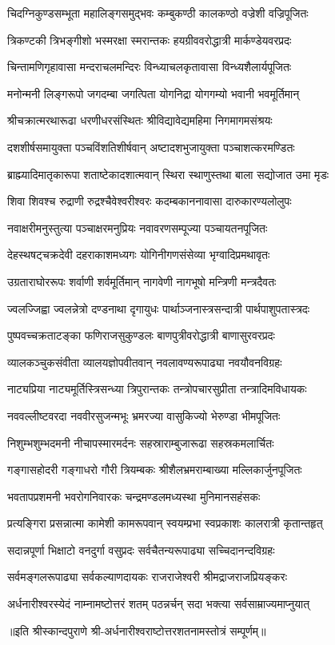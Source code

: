 \twolineshloka
{चिदग्निकुण्डसम्भूता महालिङ्गसमुद्भवः}
{कम्बुकण्ठी कालकण्ठो वज्रेशी वज्रिपूजितः}%

\twolineshloka
{त्रिकण्टकी त्रिभङ्गीशो भस्मरक्षा स्मरान्तकः}
{हयग्रीववरोद्धात्री मार्कण्डेयवरप्रदः}%

\twolineshloka
{चिन्तामणिगृहावासा मन्दराचलमन्दिरः}
{विन्ध्याचलकृतावासा विन्ध्यशैलार्यपूजितः}%

\twolineshloka
{मनोन्मनी लिङ्गरूपो जगदम्बा जगत्पिता}
{योगनिद्रा योगगम्यो भवानी भवमूर्तिमान्}%

\twolineshloka
{श्रीचक्रात्मरथारूढा धरणीधरसंस्थितः}
{श्रीविद्यावेद्यमहिमा निगमागमसंश्रयः}%

\twolineshloka
{दशशीर्षसमायुक्ता पञ्चविंशतिशीर्षवान्}
{अष्टादशभुजायुक्ता पञ्चाशत्करमण्डितः}%

\twolineshloka
{ब्राह्म्यादिमातृकारूपा शताष्टेकादशात्मवान्}
{स्थिरा स्थाणुस्तथा बाला सद्योजात उमा मृडः}%

\twolineshloka
{शिवा शिवश्च रुद्राणी रुद्रश्चैवेश्वरीश्वरः}
{कदम्बकाननावासा दारुकारण्यलोलुपः}%

\twolineshloka
{नवाक्षरीमनुस्तुत्या पञ्चाक्षरमनुप्रियः}
{नवावरणसम्पूज्या पञ्चायतनपूजितः}%

\twolineshloka
{देहस्थषट्चक्रदेवी दहराकाशमध्यगः}
{योगिनीगणसंसेव्या भृग्वादिप्रमथावृतः}%

\twolineshloka
{उग्रताराघोररूपः शर्वाणी शर्वमूर्तिमान्}
{नागवेणी नागभूषो मन्त्रिणी मन्त्रदैवतः}%

\twolineshloka
{ज्वलज्जिह्वा ज्वलन्नेत्रो दण्डनाथा दृगायुधः}
{पार्थाञ्जनास्त्रसन्दात्री पार्थपाशुपतास्त्रदः}%

\twolineshloka
{पुष्पवच्चक्रताटङ्का फणिराजसुकुण्डलः}
{बाणपुत्रीवरोद्धात्री बाणासुरवरप्रदः}%

\twolineshloka
{व्यालकञ्चुकसंवीता व्यालयज्ञोपवीतवान्}
{नवलावण्यरूपाढ्या नवयौवनविग्रहः}%

\twolineshloka
{नाट्यप्रिया नाट्यमूर्तिस्त्रिसन्ध्या त्रिपुरान्तकः}
{तन्त्रोपचारसुप्रीता तन्त्रादिमविधायकः}%

\twolineshloka
{नववल्लीष्टवरदा नववीरसुजन्मभूः}
{भ्रमरज्या वासुकिज्यो भेरुण्डा भीमपूजितः}%

\twolineshloka
{निशुम्भशुम्भदमनी नीचापस्मारमर्दनः}
{सहस्राराम्बुजारूढा सहस्रकमलार्चितः}%

\twolineshloka
{गङ्गासहोदरी गङ्गाधरो गौरी त्रियम्बकः}
{श्रीशैलभ्रमराम्बाख्या मल्लिकार्जुनपूजितः}%

\twolineshloka
{भवतापप्रशमनी भवरोगनिवारकः}
{चन्द्रमण्डलमध्यस्था मुनिमानसहंसकः}%

\twolineshloka
{प्रत्यङ्गिरा प्रसन्नात्मा कामेशी कामरूपवान्}
{स्वयम्प्रभा स्वप्रकाशः कालरात्री कृतान्तहृत्}%

\twolineshloka
{सदान्नपूर्णा भिक्षाटो वनदुर्गा वसुप्रदः}
{सर्वचैतन्यरूपाढ्या सच्चिदानन्दविग्रहः}%

\twolineshloka
{सर्वमङ्गलरूपाढ्या सर्वकल्याणदायकः}
{राजराजेश्वरी श्रीमद्राजराजप्रियङ्करः}%

\twolineshloka
{अर्धनारीश्वरस्येदं नाम्नामष्टोत्तरं शतम्}
{पठन्नर्चन् सदा भक्त्या सर्वसाम्राज्यमाप्नुयात्}%

॥इति श्रीस्कान्दपुराणे श्री-अर्धनारीश्वराष्टोत्तरशतनामस्तोत्रं सम्पूर्णम्॥